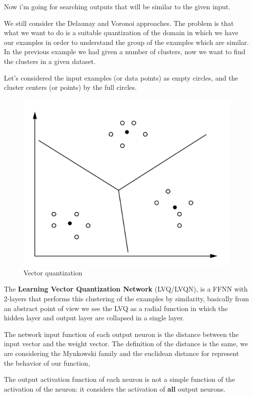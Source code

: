 \documentclass{article}
\begin{document}
Now i'm going for searching outputs that will be similar to the given input.

We still consider the Delaunay and Voronoi approaches.
The problem is that what we want to do is a suitable quantization of the domain in which
we have our examples in order to understand the group of the examples which are similar.
In the previous example we had given a number of clusters, now we want to find the clusters
in a given dataset.

Let's considered the input examples (or data points) as empty circles, and the cluster centers
(or points) by the full circles.
\begin{figure}[H]
    \centering
    \includegraphics[scale=0.5]{images/vector_quant.png}
    \caption{Vector quantization}
\end{figure}
The \textbf{Learning Vector Quantization Network} (LVQ/LVQN), is a FFNN with 2-layers that performs this clustering
of the examples by similarity, basically from an abstract point of view we see the LVQ as a radial
function in which the hidden layer and output layer are collapsed in a single layer.

The network input function of each output neuron is the distance between the input vector and the
weight vector. The definition of the distance is the same, we are considering the Mynkowski family
and the euclidean distance for represent the behavior of our function,

The output activation function of each neuron is not a simple function of the activation of the
neuron: it considers the activation of \textbf{all} output neurons.
\end{document}
